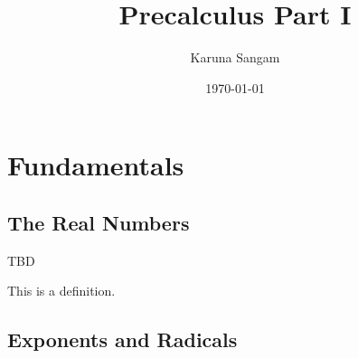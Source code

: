 \documentclass[boxes,sansserif]{seastaralgebras_expository}
\title{Precalculus Part I}
\author{Karuna Sangam} %
\date{\today} %
\begin{document}
\maketitle


\section{Fundamentals}

\subsection{The Real Numbers}

TBD

\begin{defn}
This is a definition.
\end{defn}




\subsection{Exponents and Radicals}



\end{document}
